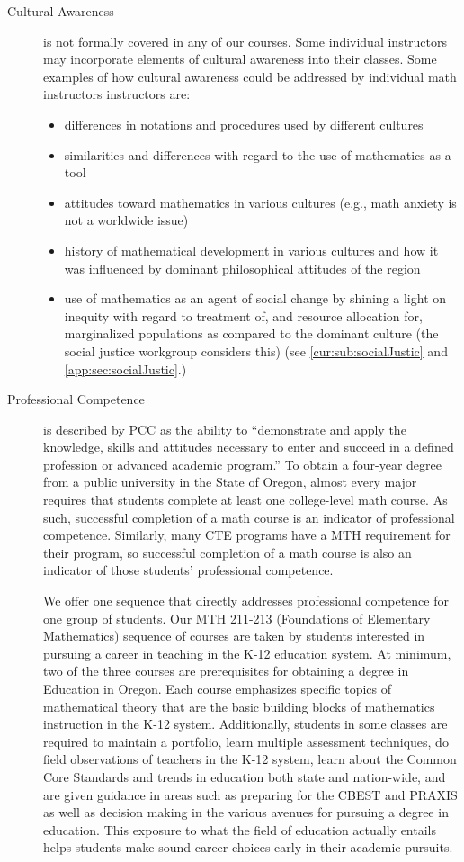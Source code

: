\begin{description}
\item[Cultural Awareness] is not formally covered in any of our courses.  Some individual instructors may incorporate elements of cultural awareness into their classes.  Some examples of how cultural awareness could be addressed by individual math instructors instructors are: 
\begin{itemize}
\item differences in notations and procedures used by different cultures
\item similarities and differences with regard to the use of mathematics as a tool 
\item attitudes toward mathematics in various cultures (e.g., math anxiety is not a worldwide issue) 
\item history of mathematical  development in various cultures and how it was influenced by dominant philosophical attitudes of the region
\item use of mathematics as an agent of social change by shining a light on inequity with regard to treatment of, and resource allocation for, marginalized populations as compared to the dominant culture (the social justice workgroup considers this) (see \vref{cur:sub:socialJustic} and \vref{app:sec:socialJustic}.) 
\end{itemize}

\item[Professional Competence] is described by PCC as the ability to ``demonstrate and apply the knowledge, skills and attitudes necessary to enter and succeed in a defined profession or advanced academic program.'' To obtain a four-year degree from a public university in the State of Oregon, almost every major requires that students complete at least one college-level math course.  As such, successful completion of a math course is an indicator of professional competence.  Similarly, many CTE programs have a MTH requirement for their program, so successful completion of a math course is also an indicator of those students' professional competence. 

We offer one sequence that directly addresses professional competence for one group of students.  Our  MTH 211-213 (Foundations of Elementary Mathematics) sequence of courses are taken by students interested in pursuing a career in teaching in the K-12 education system.  At minimum, two of the three courses are prerequisites for obtaining a degree in Education in Oregon.  Each course emphasizes specific topics of mathematical theory that are the basic building blocks of mathematics instruction in the K-12 system.  Additionally, students in some classes are required to maintain a portfolio, learn multiple assessment techniques, do field observations of teachers in the K-12 system, learn about the Common Core Standards and trends in education both state and nation-wide, and are given guidance in areas such as preparing for the CBEST and PRAXIS as well as decision making in the various avenues for pursuing a degree in education.  This exposure to what the field of education actually entails  helps students make sound career choices early in their academic pursuits.


\end{description}
